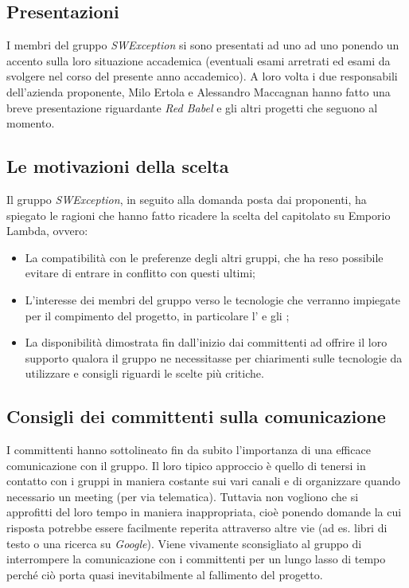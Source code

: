 \subsection{Presentazioni}
I membri del gruppo \textit{SWException} si sono presentati ad uno ad uno ponendo un accento sulla loro situazione accademica (eventuali esami arretrati ed esami da svolgere nel corso del presente anno accademico). A loro volta i due responsabili dell'azienda proponente, Milo Ertola e Alessandro Maccagnan hanno fatto una breve presentazione riguardante \emph{Red Babel} e gli altri progetti che seguono al momento.

\subsection{Le motivazioni della scelta}
Il gruppo \textit{SWException}, in seguito alla domanda posta dai proponenti, ha spiegato le ragioni che hanno fatto ricadere la scelta del capitolato su Emporio Lambda, ovvero:
	\begin{itemize}
	\item La compatibilità con le preferenze degli altri gruppi, che ha reso possibile evitare di entrare in conflitto con questi ultimi;
	\item L'interesse dei membri del gruppo verso le tecnologie che verranno impiegate per il compimento del progetto, in particolare l' e gli ;
	\item La disponibilità dimostrata fin dall'inizio dai committenti ad offrire il loro supporto qualora il gruppo ne necessitasse per chiarimenti sulle tecnologie da utilizzare e consigli riguardi le scelte più critiche.
	\end{itemize}
\subsection{Consigli dei committenti sulla comunicazione}
I committenti hanno sottolineato fin da subito l'importanza di una efficace comunicazione con il gruppo. 
Il loro tipico approccio è quello di tenersi in contatto con i gruppi in maniera costante sui vari canali  e di organizzare quando necessario un meeting (per via telematica).
Tuttavia non vogliono che si approfitti del loro tempo in maniera inappropriata, cioè ponendo domande la cui risposta potrebbe essere facilmente reperita attraverso altre vie (ad es. libri di testo o una ricerca su \textit{Google}).
Viene vivamente sconsigliato al gruppo di interrompere la comunicazione con i committenti per un lungo lasso di tempo perché ciò porta quasi inevitabilmente al fallimento del progetto.

